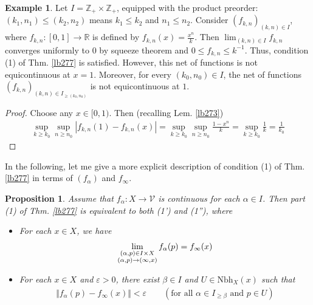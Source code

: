 \documentclass[12pt,b5paper,notitlepage]{article}
\theoremstyle{definition}
\newtheorem{eg}[df]{Example}
\theoremstyle{plain}
\newtheorem{pp}[df]{Proposition}
\newcommand{\mc}{\mathcal}
\newcommand{\Zbb}{\mathbb Z}
\newcommand{\Rbb}{\mathbb R}
\newcommand{\dps}{\displaystyle}
\newcommand{\Nbh}{\mathrm{Nbh}}
\newcommand{\eps}{\varepsilon}
\numberwithin{equation}{section}
\begin{document}
\begin{eg}
Let $I=\Zbb_+\times\Zbb_+$, equipped with the product preorder: $(k_1,n_1)\leq (k_2,n_2)$ means $k_1\leq k_2$ and $n_1\leq n_2$. Consider $(f_{k,n})_{(k,n)\in I}$, where $f_{k,n}:[0,1]\rightarrow\Rbb$ is defined by $\dps f_{k,n}(x)=\frac{x^n}{k}$. Then $\lim_{(k,n)\in I}f_{k,n}$ converges uniformly to $0$ by squeeze theorem and $0\leq f_{k,n}\leq k^{-1}$. Thus, condition (1) of Thm. \ref{lb277} is satisfied. However, this net of functions is not equicontinuous at $x=1$. Moreover, for every $(k_0,n_0)\in I$, the net of functions $(f_{k,n})_{(k,n)\in I_{\geq(k_0,n_0)}}$ is not equicontinuous at $1$.
\end{eg}

\begin{proof}
Choose any $x\in[0,1)$. Then (recalling Lem. \ref{lb273})
\begin{align*}
\sup_{k\geq k_0}\sup_{n\geq n_0}|f_{k,n}(1)-f_{k,n}(x)|=\sup_{k\geq k_0}\sup_{n\geq n_0}\frac{1-x^n}{k}=\sup_{k\geq k_0}\frac 1k=\frac 1{k_0}
\end{align*}
\end{proof}




In the following, let me give a more explicit description of condition (1) of Thm. \ref{lb277} in terms of $(f_\alpha)$ and $f_\infty$. 


\begin{pp}\label{lb281}
Assume that $f_\alpha:X\rightarrow\mc V$ is continuous for each $\alpha\in I$. Then part (1) of Thm. \ref{lb277} is equivalent to both (1') and (1''), where
\begin{itemize}
\item[(1')] For each $x\in X$, we have 
\begin{align}\label{eq87}
\lim_{
\begin{subarray}{c}
(\alpha,p)\in I\times X\\
(\alpha,p)\rightarrow (\infty,x)
\end{subarray}
}
f_\alpha(p)=f_\infty(x)
\end{align}
\item[(1'')] For each $x\in X$ and $\eps>0$, there exist $\beta\in I$ and $U\in\Nbh_X(x)$ such that 
\begin{align}\label{eq79}
\Vert f_\alpha(p)-f_\infty(x)\Vert<\eps\qquad (\text{for all } \alpha\in I_{\geq\beta}\text{ and } p\in U)
\end{align}
\end{itemize}
\end{pp}
\end{document}
